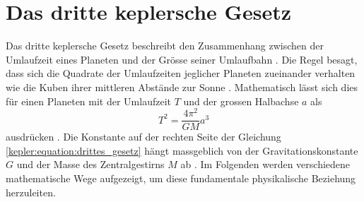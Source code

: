 %
%
%
%
\section{Das dritte keplersche Gesetz
  \label{kepler:section:einleitung}}

Das dritte keplersche Gesetz beschreibt den Zusammenhang zwischen der Umlaufzeit eines Planeten und der Grösse seiner Umlaufbahn \cite{vogt1995}.
Die Regel besagt, dass sich die Quadrate der Umlaufzeiten jeglicher Planeten zueinander verhalten wie die Kuben ihrer mittleren Abstände zur Sonne \cite{vogt1995}.
Mathematisch lässt sich dies für einen Planeten mit der Umlaufzeit \(T\) und der grossen Halbachse \(a\) als
\begin{equation}
    T^2 = \frac{4\pi^2}{GM} a^3
    \label{kepler:equation:drittes_gesetz}
\end{equation}
ausdrücken \cite{vogt1995}.
Die Konstante auf der rechten Seite der Gleichung \eqref{kepler:equation:drittes_gesetz} hängt massgeblich von der Gravitationskonstante \(G\) und der Masse des Zentralgestirns \(M\) ab \cite{vogt1995}.
Im Folgenden werden verschiedene mathematische Wege aufgezeigt, um diese fundamentale physikalische Beziehung herzuleiten.